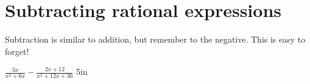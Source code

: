 \section{Subtracting rational expressions}


\begin{tcolorbox}[center,colback=white,width=6.5in,]
    Subtraction is similar to addition, 
    but remember to  the negative.
    This is easy to forget!
\end{tcolorbox}

    {
        $
        \frac{3x}{x^2+6x}
        -
        \frac{2x+12}{x^2+12x+36}
        $
    }
    {5in}

